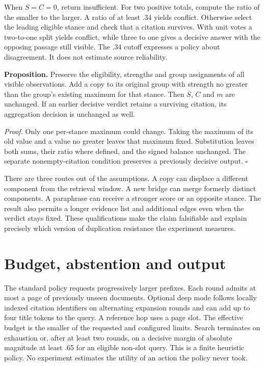 When $S=C=0$, return insufficient. For two positive totals, compute the ratio of the smaller to the larger. A ratio of at least .34 yields conflict. Otherwise select the leading eligible stance and check that a citation survives. With unit votes a two-to-one split yields conflict, while three to one gives a decisive answer with the opposing passage still visible. The .34 cutoff expresses a policy about disagreement. It does not estimate source reliability.

\textbf{Proposition.} Preserve the eligibility, strengths and group assignments of all visible observations. Add a copy to its original group with strength no greater than the group's existing maximum for that stance. Then $S$, $C$ and $m$ are unchanged. If an earlier decisive verdict retains a surviving citation, its aggregation decision is unchanged as well.

\emph{Proof.} Only one per-stance maximum could change. Taking the maximum of its old value and a value no greater leaves that maximum fixed. Substitution leaves both sums, their ratio where defined, and the signed balance unchanged. The separate nonempty-citation condition preserves a previously decisive output. \hfill$\square$

There are three routes out of the assumptions. A copy can displace a different component from the retrieval window. A new bridge can merge formerly distinct components. A paraphrase can receive a stronger score or an opposite stance. The result also permits a longer evidence list and additional edges even when the verdict stays fixed. These qualifications make the claim falsifiable and explain precisely which version of duplication resistance the experiment measures.

\section{Budget, abstention and output}
The standard policy requests progressively larger prefixes. Each round admits at most a page of previously unseen documents. Optional deep mode follows locally indexed citation identifiers on alternating expansion rounds and can add up to four title tokens to the query. A reference hop uses a page slot. The effective budget is the smaller of the requested and configured limits. Search terminates on exhaustion or, after at least two rounds, on a decisive margin of absolute magnitude at least .65 for an eligible non-slot query. This is a finite heuristic policy. No experiment estimates the utility of an action the policy never took.


